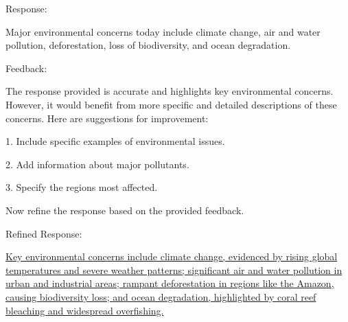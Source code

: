 \begin{itemize}
\begin{tcolorbox}
Response:

\vspace{0.2em}

Major environmental concerns today include climate change, air and water pollution, deforestation, loss of biodiversity, and ocean degradation.

\vspace{0.5em}

Feedback:

\vspace{0.2em}

The response provided is accurate and highlights key environmental concerns. However, it would benefit from more specific and detailed descriptions of these concerns. Here are suggestions for improvement:

\vspace{0.2em}

\hspace{1em} 1. Include specific examples of environmental issues.

\vspace{0.1em}

\hspace{1em} 2. Add information about major pollutants.

\vspace{0.1em}

\hspace{1em} 3. Specify the regions most affected.

\vspace{0.5em}

Now refine the response based on the provided feedback.

\vspace{0.2em}

Refined Response:

\vspace{0.2em}

\uline{Key environmental concerns include climate change, evidenced by rising global temperatures and severe weather patterns; significant air and water pollution in urban and industrial areas; rampant deforestation in regions like the Amazon, causing biodiversity loss; and ocean degradation, highlighted by coral reef bleaching and widespread overfishing.}

\endgroup

\end{tcolorbox}
\vspace{0.5em}

\end{itemize}

